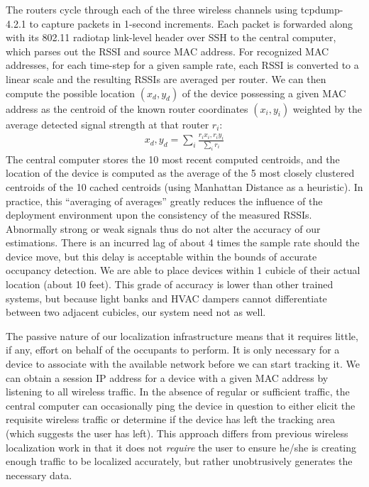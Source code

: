 The routers cycle through each of the three wireless channels using tcpdump-4.2.1 to capture packets in 1-second increments. Each packet is forwarded along with its 802.11 radiotap link-level header over SSH to the central computer, which parses out the RSSI and source MAC address. For recognized MAC addresses, for each time-step for a given sample rate, each RSSI is converted to a linear scale and the resulting RSSIs are averaged per router. We can then compute the possible location $(x_d,y_d)$ of the device possessing a given MAC address as the centroid of the known router coordinates $(x_i, y_i)$ weighted by the average detected signal strength at that router $r_i$:
\begin{equation}
\begin{split}
x_d, y_d = \displaystyle\sum_{i} \frac{r_ix_i, r_iy_i}{\displaystyle\sum_i r_i}
\end{split}
\end{equation}
The central computer stores the 10 most recent computed centroids, and the location of the device is computed as the average of the 5 most closely clustered centroids of the 10 cached centroids (using Manhattan Distance as a heuristic). In practice, this ``averaging of averages'' greatly reduces the influence of the deployment environment upon the consistency of the measured RSSIs. Abnormally strong or weak signals thus do not alter the accuracy of our estimations. There is an incurred lag of about 4 times the sample rate should the device move, but this delay is acceptable within the bounds of accurate occupancy detection. We are able to place devices within 1 cubicle of their actual location (about 10 feet). This grade of accuracy is lower than other trained systems, but because light banks and HVAC dampers cannot differentiate between two adjacent cubicles, our system need not as well.

The passive nature of our localization infrastructure means that it requires little, if any, effort on behalf of the occupants to perform. It is only necessary for a device to associate with the available network before we can start tracking it. We can obtain a session IP address for a device with a given MAC address by listening to all wireless traffic. In the absence of regular or sufficient traffic, the central computer can occasionally ping the device in question to either elicit the requisite wireless traffic or determine if the device has left the tracking area (which suggests the user has left). This approach differs from previous wireless localization work in that it does not \emph{require} the user to ensure he/she is creating enough traffic to be localized accurately, but rather unobtrusively generates the necessary data. 

